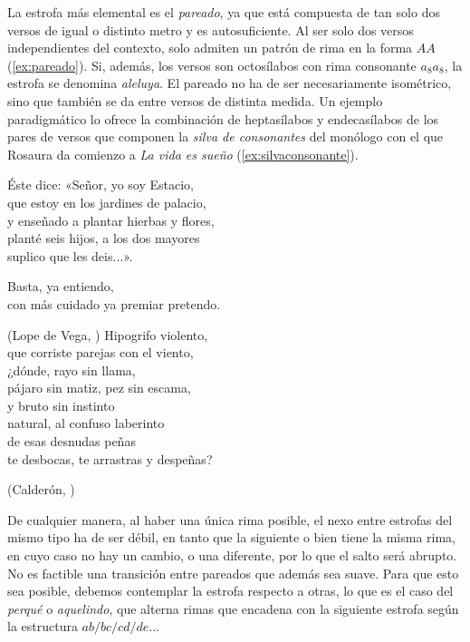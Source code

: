 La estrofa más elemental es el \textit{pareado}, ya que está compuesta de tan solo dos versos de igual o distinto metro y es autosuficiente. Al ser solo dos versos independientes del contexto, solo admiten un patrón de rima en la forma $AA$ (\ref{ex:pareado}). Si, además, los versos son octosílabos con rima consonante $a_{8}a_{8}$, la estrofa se denomina \textit{aleluya}. El pareado no ha de ser necesariamente isométrico, sino que también se da entre versos de distinta medida. Un ejemplo paradigmático lo ofrece la combinación de heptasílabos y endecasílabos de los pares de versos que componen la \textit{silva de consonantes} del monólogo con el que Rosaura da comienzo a \textit{La vida es sueño} (\ref{ex:silvaconsonante}).

\begin{exe}
	\ex\label{ex:pareado}Éste dice: «Señor, yo soy Estacio,\\
		que estoy en los jardines de palacio,\vspace{.333\baselineskip}\\
		y enseñado a plantar hierbas y flores,\\
		planté seis hijos, a los dos mayores\vspace{.333\baselineskip}\\	
		suplico que les deis...».\\
		\strut\hspace{10em}Basta, ya entiendo,\\
		con más cuidado ya premiar pretendo.\\
	\strut\hfill(Lope de Vega, )
	\ex \label{ex:silvaconsonante}Hipogrifo violento,\\
	que corriste parejas con el viento,\\
	¿dónde, rayo sin llama,\\
	pájaro sin matiz, pez sin escama,\\
	y bruto sin instinto\\
	natural, al confuso laberinto\\
	de esas desnudas peñas\\
	te desbocas, te arrastras y despeñas?\\
	\strut\hfill(Calderón, )
\end{exe}

De cualquier manera, al haber una única rima posible, el nexo entre estrofas del mismo tipo ha de ser débil, en tanto que la siguiente o bien tiene la misma rima, en cuyo caso no hay un cambio, o una diferente, por lo que el salto será abrupto. No es factible una transición entre pareados que además sea suave. Para que esto sea posible, debemos contemplar la estrofa respecto a otras, lo que es el caso del \textit{perqué} o \textit{aquelindo}, que alterna rimas que encadena con la siguiente estrofa según la estructura $ab/bc/cd/de...$

